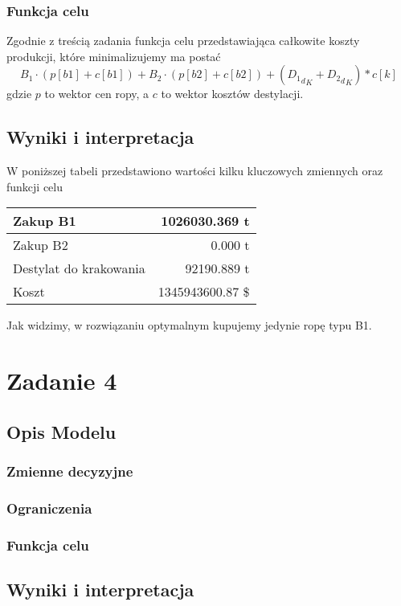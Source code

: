 \documentclass{article}
\begin{document}
\subsubsection{Funkcja celu}
Zgodnie z treścią zadania funkcja celu przedstawiająca całkowite koszty produkcji, które minimalizujemy ma postać
\[B_1 \cdot (p[b1] + c[b1]) + B_2 \cdot (p[b2] + c[b2]) + ({{D_1}_d}_K + {{D_2}_d}_K)*c[k]\]
gdzie $p$ to wektor cen ropy, a $c$ to wektor kosztów destylacji.
\subsection{Wyniki i interpretacja}
W poniższej tabeli przedstawiono wartości kilku kluczowych zmiennych oraz funkcji celu
\begin{table}[H]
\centering
\begin{tabular}{|l|r|}\hline
Zakup B1 & 1026030.369 t\\\hline
Zakup B2 & 0.000 t\\\hline
Destylat do krakowania & 92190.889 t\\\hline
Koszt & 1345943600.87 \$\\\hline
\end{tabular}
\end{table}

Jak widzimy, w rozwiązaniu optymalnym kupujemy jedynie ropę typu B1.

\section{Zadanie 4}
\subsection{Opis Modelu}
\subsubsection{Zmienne decyzyjne}
\subsubsection{Ograniczenia}
\subsubsection{Funkcja celu}
\subsection{Wyniki i interpretacja}
\end{document}
